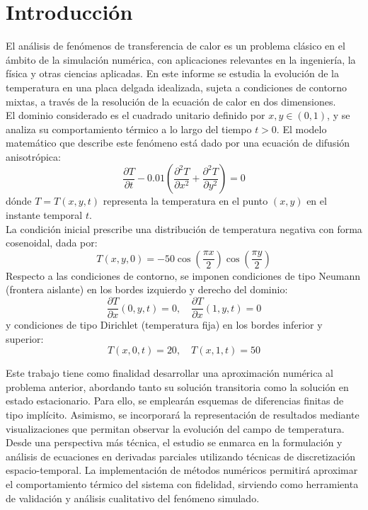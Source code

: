 \documentclass{article}
\begin{document}
\newpage
\tableofcontents

\newpage
\section{Introducción}

El análisis de fenómenos de transferencia de calor es un problema clásico en el ámbito de la simulación numérica, con aplicaciones relevantes en la ingeniería, la física y otras ciencias aplicadas. En este informe se estudia la evolución de la temperatura en una placa delgada idealizada, sujeta a condiciones de contorno mixtas, a través de la resolución de la ecuación de calor en dos dimensiones. \\

El dominio considerado es el cuadrado unitario definido por $x, y \in (0,1)$, y se analiza su comportamiento térmico a lo largo del tiempo $t > 0$. El modelo matemático que describe este fenómeno está dado por una ecuación de difusión anisotrópica:
$$
\frac{\partial T}{\partial t} - 0.01\left( \frac{\partial^2 T}{\partial x^2} + \frac{\partial^2 T}{\partial y^2} \right) = 0
$$
dónde $T = T(x, y, t)$ representa la temperatura en el punto $(x, y)$ en el instante temporal $t$.\\

La condición inicial prescribe una distribución de temperatura negativa con forma cosenoidal, dada por:
$$
T(x, y, 0) = -50 \cos\left(\frac{\pi x}{2}\right) \cos\left(\frac{\pi y}{2}\right)
$$
Respecto a las condiciones de contorno, se imponen condiciones de tipo Neumann (frontera aislante) en los bordes izquierdo y derecho del dominio:
$$
\frac{\partial T}{\partial x}(0, y, t) = 0, \quad \frac{\partial T}{\partial x}(1, y, t) = 0
$$
y condiciones de tipo Dirichlet (temperatura fija) en los bordes inferior y superior:
$$
T(x, 0, t) = 20, \quad T(x, 1, t) = 50
$$

Este trabajo tiene como finalidad desarrollar una aproximación numérica al problema anterior, abordando tanto su solución transitoria como la solución en estado estacionario. Para ello, se emplearán esquemas de diferencias finitas de tipo implícito. Asimismo, se incorporará la representación de resultados mediante visualizaciones que permitan observar la evolución del campo de temperatura.\\

Desde una perspectiva más técnica, el estudio se enmarca en la formulación y análisis de ecuaciones en derivadas parciales utilizando técnicas de discretización espacio-temporal. La implementación de métodos numéricos permitirá aproximar el comportamiento térmico del sistema con fidelidad, sirviendo como herramienta de validación y análisis cualitativo del fenómeno simulado.
\end{document}
